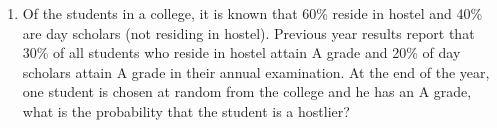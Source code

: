 \renewcommand{\theequation}{\theenumi}
\begin{enumerate}[label=\thesection.\arabic*.,ref=\thesection.\theenumi]
\item Of the students in a college, it is known that
60\% reside in hostel and 40\% are day scholars
(not residing in hostel). Previous year results
report that 30\% of all students who reside in
hostel attain A grade and 20\% of day scholars
attain A grade in their annual examination.
At the end of the year, one student is chosen
at random from the college and he has an A
grade, what is the probability that the student
is a hostlier?
\end{enumerate}